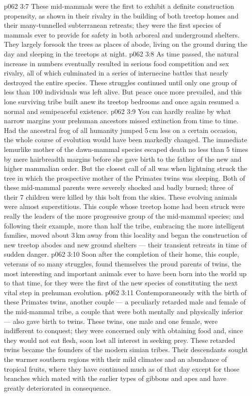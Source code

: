 \vs p062 3:7 These mid\hyp{}mammals were the first to exhibit a definite construction propensity, as shown in their rivalry in the building of both treetop homes and their many\hyp{}tunnelled subterranean retreats; they were the first species of mammals ever to provide for safety in both arboreal and underground shelters. They largely forsook the trees as places of abode, living on the ground during the day and sleeping in the treetops at night.
\vs p062 3:8 As time passed, the natural increase in numbers eventually resulted in serious food competition and sex rivalry, all of which culminated in a series of internecine battles that nearly destroyed the entire species. These struggles continued until only one group of less than 100 individuals was left alive. But peace once more prevailed, and this lone surviving tribe built anew its treetop bedrooms and once again resumed a normal and semipeaceful existence.
\vs p062 3:9 \pc You can hardly realize by what narrow margins your prehuman ancestors missed extinction from time to time. Had the ancestral frog of all humanity jumped 5\,cm less on a certain occasion, the whole course of evolution would have been markedly changed. The immediate lemurlike mother of the dawn\hyp{}mammal species escaped death no less than 5 times by mere hairbreadth margins before she gave birth to the father of the new and higher mammalian order. But the closest call of all was when lightning struck the tree in which the prospective mother of the Primates twins was sleeping. Both of these mid\hyp{}mammal parents were severely shocked and badly burned; three of their 7 children were killed by this bolt from the skies. These evolving animals were almost superstitious. This couple whose treetop home had been struck were really the leaders of the more progressive group of the mid\hyp{}mammal species; and following their example, more than half the tribe, embracing the more intelligent families, moved about 3\,km away from this locality and began the construction of new treetop abodes and new ground shelters --- their transient retreats in time of sudden danger.
\vs p062 3:10 Soon after the completion of their home, this couple, veterans of so many struggles, found themselves the proud parents of twins, the most interesting and important animals ever to have been born into the world up to that time, for they were the first of the new species of  constituting the next vital step in prehuman evolution.
\vs p062 3:11 \pc Contemporaneously with the birth of these Primates twins, another couple --- a peculiarly retarded male and female of the mid\hyp{}mammal tribe, a couple that were both mentally and physically inferior --- also gave birth to twins. These twins, one male and one female, were indifferent to conquest; they were concerned only with obtaining food and, since they would not eat flesh, soon lost all interest in seeking prey. These retarded twins became the founders of the modern simian tribes. Their descendants sought the warmer southern regions with their mild climates and an abundance of tropical fruits, where they have continued much as of that day except for those branches which mated with the earlier types of gibbons and apes and have greatly deteriorated in consequence.
